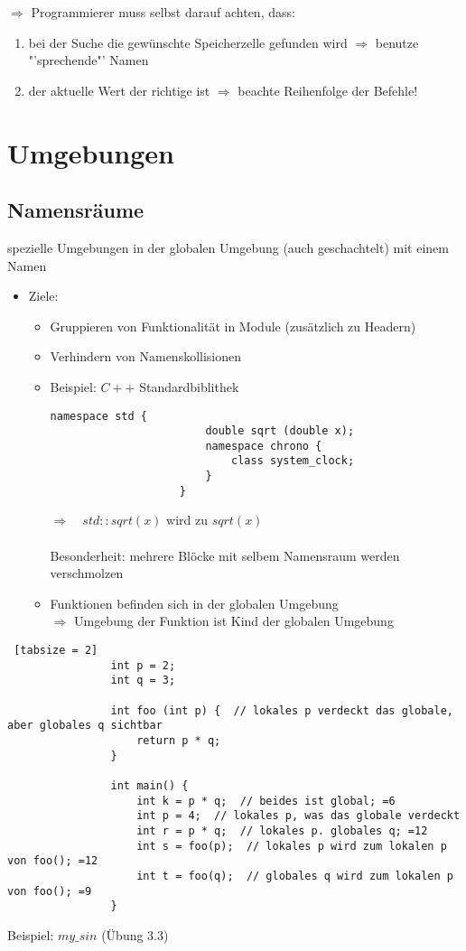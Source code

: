 \documentclass{article}
\begin{document}
	 $\Rightarrow$ Programmierer muss selbst darauf achten, dass:
	 \begin{enumerate}
	 	\item bei der Suche die gewünschte Speicherzelle gefunden wird $\Rightarrow$ benutze "'sprechende"' Namen
	 	\item der aktuelle Wert der richtige ist $\Rightarrow$ beachte Reihenfolge der Befehle!
	 \end{enumerate}
	 
	 \section{Umgebungen}
	 \subsection{Namensräume}
	 
		 spezielle Umgebungen in der globalen Umgebung (auch geschachtelt) mit einem Namen
	 	\begin{itemize}
	 		\item Ziele:
	 		\begin{itemize}
	 			\item Gruppieren von Funktionalität in Module (zusätzlich zu Headern)
	 			\item Verhindern von Namenskollisionen
	 			\item Beispiel: $C++$ Standardbiblithek
	 			\begin{lstlisting}[tabsize = 2]
	 				namespace std {
		 				double sqrt (double x);
		 				namespace chrono {
			 				class system_clock;
		 				}
	 				}
	 			\end{lstlisting}
	 			$\Rightarrow \quad std::sqrt(x)$ wird zu $sqrt(x)$ \\ \\
	 			Besonderheit: mehrere Blöcke mit selbem Namensraum werden verschmolzen
	 			\item Funktionen befinden sich in der globalen Umgebung \\
	 			$\Rightarrow$ Umgebung der Funktion ist Kind der globalen Umgebung
	 		\end{itemize}
	 		\end{itemize}
	 		\begin{lstlisting} [tabsize = 2]
	 			int p = 2;
	 			int q = 3;
	 			
	 			int foo (int p) {  // lokales p verdeckt das globale, aber globales q sichtbar
		 			return p * q;
	 			}
	 			
	 			int main() {
		 			int k = p * q;  // beides ist global; =6
		 			int p = 4;  // lokales p, was das globale verdeckt
		 			int r = p * q;  // lokales p. globales q; =12
		 			int s = foo(p);  // lokales p wird zum lokalen p von foo(); =12
		 			int t = foo(q);  // globales q wird zum lokalen p von foo(); =9
	 			}
	 		\end{lstlisting}
		 	 Beispiel: $\textit{my\_sin}$ (Übung 3.3)
\end{document}
